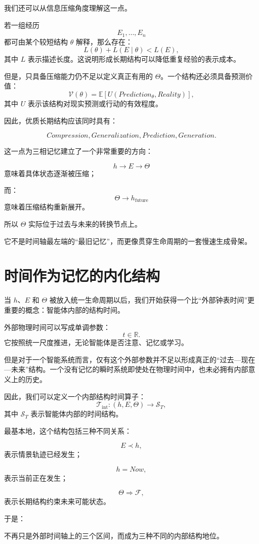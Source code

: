 我们还可以从信息压缩角度理解这一点。

若一组经历
\[
E_1,\ldots,E_n
\]
都可由某个较短结构 \(\theta\) 解释，那么存在：
\[
L(\theta)
+
L(E\mid\theta)
<
L(E),
\]
其中 \(L\) 表示描述长度。这说明形成长期结构可以降低重复经验的表示成本。

但是，只具备压缩能力仍不足以定义真正有用的 \(\Theta\)。一个结构还必须具备预测价值：
\[
\mathcal V(\theta)
=
\mathbb E
[
U(
Prediction_\theta,
Reality
)
],
\]
其中 \(U\) 表示该结构对现实预测或行动的有效程度。

因此，优质长期结构应该同时具有：

\[
Compression,
Generalization,
Prediction,
Generation.
\]

这一点为三相记忆建立了一个非常重要的方向：

\[
h
\rightarrow
E
\rightarrow
\Theta
\]
意味着具体状态逐渐被压缩；

而：
\[
\Theta
\rightarrow
h_{\mathrm{future}}
\]
意味着压缩结构重新展开。

所以 \(\Theta\) 实际位于过去与未来的转换节点上。

它不是时间轴最左端的“最旧记忆”，而更像贯穿生命周期的一套慢速生成骨架。

\section{时间作为记忆的内化结构}

当 \(h\)、\(E\) 和 \(\Theta\) 被放入统一生命周期以后，我们开始获得一个比“外部钟表时间”更重要的概念：智能体内部的结构时间。

外部物理时间可以写成单调参数：
\[
t\in\mathbb R.
\]
它按照统一尺度推进，无论智能体是否注意、记忆或学习。

但是对于一个智能系统而言，仅有这个外部参数并不足以形成真正的“过去—现在—未来”结构。一个没有记忆的瞬时系统即使处在物理时间中，也未必拥有内部意义上的历史。

因此，我们可以定义一个内部结构时间算子：
\[
\mathcal T_{\mathrm{int}}
:
(h,E,\Theta)
\rightarrow
\mathcal S_T,
\]
其中 \(\mathcal S_T\) 表示智能体内部的时间结构。

最基本地，这个结构包括三种不同关系：

\[
E
\prec
h,
\]
表示情景轨迹已经发生；

\[
h
=
Now,
\]
表示当前正在发生；

\[
\Theta
\Rightarrow
\mathcal F,
\]
表示长期结构约束未来可能状态。

于是：
\begin{statementbox}
\centering
{}
\end{statementbox}
不再只是外部时间轴上的三个区间，而成为三种不同的内部结构地位。

